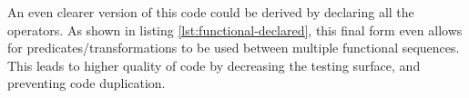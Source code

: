 \begin{minipage}{\linewidth}

\end{minipage}

An even clearer version of this code could be derived by declaring all the operators.  As shown in listing  \ref{lst:functional-declared}, this final form even allows for predicates/transformations to be used between multiple functional sequences.  This leads to higher quality of code by decreasing the testing surface, and preventing code duplication. 